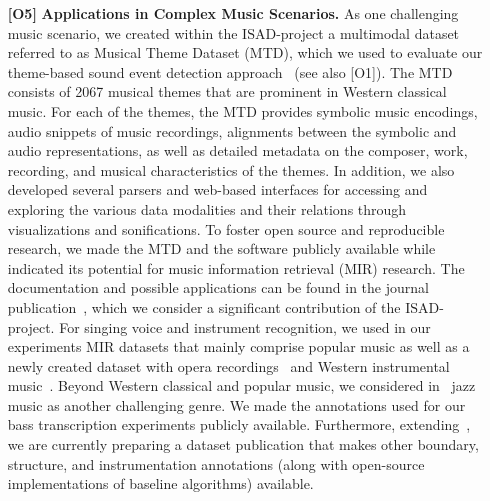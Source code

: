 \documentclass[11pt,a4paper]{article}
\def\PN{\mathrm{ISAD}}
\newenvironment{itemizePacked}{
\begin{itemize}
  \setlength{\itemsep}{1pt}
  \setlength{\parskip}{0pt}
  \setlength{\parsep}{0pt}
  \renewcommand{\labelitemi}{$\bullet$}
}{\end{itemize}}
\theoremstyle{plain} \newtheorem{define}{Definition}[section]
\begin{document}
\begin{enumerate}
\item [\textbf{[O5]}] \textbf{Applications in Complex Music Scenarios.}
%
%
%
As one challenging music scenario, we created within the $\PN$-project a multimodal dataset referred to as Musical Theme Dataset (MTD), which we used to evaluate our theme-based sound event detection approach~\cite{ZalkowM20_WeaklyAlignedTrain_ISMIR} (see also [O1]). The MTD consists of 2067 musical themes that are prominent in Western classical music. For each of the themes, the MTD provides symbolic music encodings, audio snippets of music recordings, alignments between the symbolic and audio representations, as well as detailed metadata on the composer, work, recording, and musical characteristics of the themes. In addition, we also developed several parsers and web-based interfaces for accessing and exploring the various data modalities and their relations through visualizations and sonifications. To foster open source and reproducible research, we made the MTD and the software publicly available while indicated its potential for music information retrieval (MIR) research. The documentation and possible applications can be found in the journal publication~\cite{ZalkowBAM20_MTD_TISMIR}, which we consider a significant contribution of the $\PN$-project.
%
For singing voice and instrument recognition, we used in our experiments MIR datasets that mainly comprise popular music as well as a newly created dataset with opera recordings~\cite{KrauseMW21_OperaSingingActivity_Electronics,MimilakisWAAM19_SingingVDetWagner_MML} and Western instrumental music~\cite{TaenzerAMWLM19_InstrumentReco_ISMIR}.   
%
Beyond Western classical and popular music, we considered in~\cite{AbesserBM18_BassSaliency_ISMIR,
AbesserMueller19_ContourClassification_ICASSP,
Reck19_StructureBoundary_MasterThesis,
WeissBAM18_JazzComplexity_ISMIR}  jazz music as another challenging genre. We made the annotations used for our bass transcription experiments publicly available. Furthermore, extending~\cite{Reck19_StructureBoundary_MasterThesis}, we are currently preparing a dataset publication that makes other boundary, structure, and instrumentation annotations (along with open-source implementations of baseline algorithms) available.
\end{enumerate}
\end{document}
